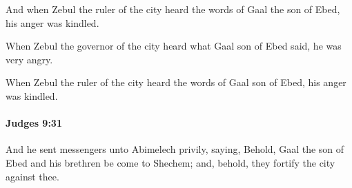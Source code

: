 			\begin{versebox}
					\item[BHS] 
					\item[ASV] And when Zebul the ruler of the city heard the words of Gaal the son of Ebed, his anger was kindled.
					\item[NIV] When Zebul the governor of the city heard what Gaal son of Ebed said, he was very angry.
					\item[NRSV] When Zebul the ruler of the city heard the words of Gaal son of Ebed, his anger was kindled.
			\end{versebox}

		\paragraph{Judges 9:31} %
			\label{JUDGES-9-31}

			And he sent messengers unto Abimelech privily, saying, Behold, Gaal the son of Ebed and his brethren be come to Shechem; and, behold, they fortify the city against thee.

